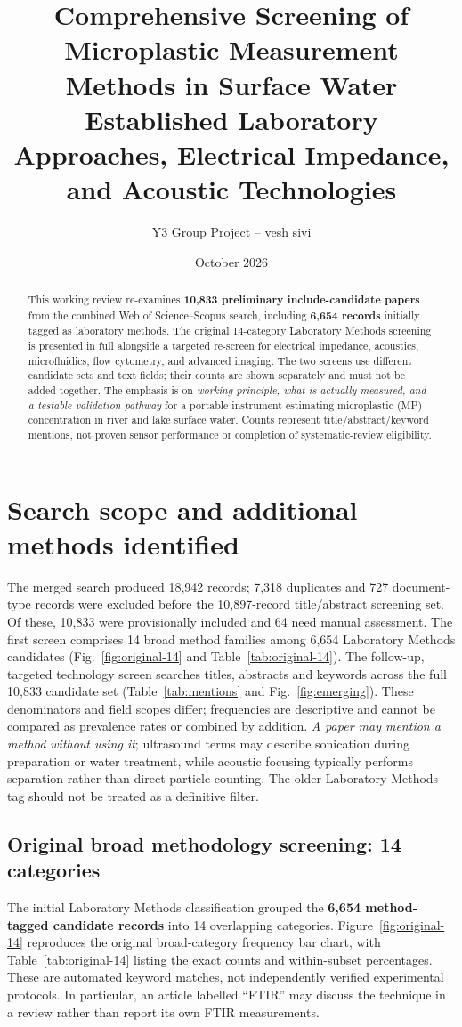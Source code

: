 \documentclass[10pt,a4paper]{article}
\title{\bfseries Comprehensive Screening of Microplastic Measurement Methods in Surface Water\\[2pt]\large Established Laboratory Approaches, Electrical Impedance, and Acoustic Technologies}
\author{Y3 Group Project -- vesh sivi}
\date{October 2026}
\begin{document}
\maketitle
\begin{abstract}
This working review re-examines \textbf{10,833 preliminary include-candidate papers} from the combined Web of Science--Scopus search, including \textbf{6,654 records} initially tagged as laboratory methods. The original 14-category Laboratory Methods screening is presented in full alongside a targeted re-screen for electrical impedance, acoustics, microfluidics, flow cytometry, and advanced imaging. The two screens use different candidate sets and text fields; their counts are shown separately and must not be added together. The emphasis is on \emph{working principle, what is actually measured, and a testable validation pathway} for a portable instrument estimating microplastic (MP) concentration in river and lake surface water. Counts represent title/abstract/keyword mentions, not proven sensor performance or completion of systematic-review eligibility.
\end{abstract}

\section{Search scope and additional methods identified}
The merged search produced 18,942 records; 7,318 duplicates and 727 document-type records were excluded before the 10,897-record title/abstract screening set. Of these, 10,833 were provisionally included and 64 need manual assessment. The first screen comprises 14 broad method families among 6,654 Laboratory Methods candidates (Fig.~\ref{fig:original-14} and Table~\ref{tab:original-14}). The follow-up, targeted technology screen searches titles, abstracts and keywords across the full 10,833 candidate set (Table~\ref{tab:mentions} and Fig.~\ref{fig:emerging}). These denominators and field scopes differ; frequencies are descriptive and cannot be compared as prevalence rates or combined by addition. \emph{A paper may mention a method without using it}; ultrasound terms may describe sonication during preparation or water treatment, while acoustic focusing typically performs separation rather than direct particle counting. The older Laboratory Methods tag should not be treated as a definitive filter.


\subsection{Original broad methodology screening: 14 categories}
The initial Laboratory Methods classification grouped the \textbf{6,654 method-tagged candidate records} into 14 overlapping categories. Figure~\ref{fig:original-14} reproduces the original broad-category frequency bar chart, with Table~\ref{tab:original-14} listing the exact counts and within-subset percentages. These are automated keyword matches, not independently verified experimental protocols. In particular, an article labelled ``FTIR'' may discuss the technique in a review rather than report its own FTIR measurements.
\end{document}
